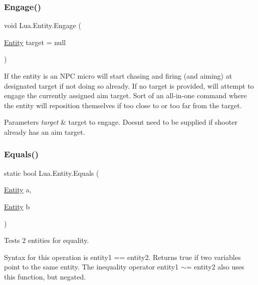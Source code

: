 \subsubsection{\texorpdfstring{Engage()}{Engage()}}
{\footnotesize\ttfamily void Lua.\+Entity.\+Engage (\begin{DoxyParamCaption}\item[{\mbox{\hyperlink{class_lua_1_1_entity}{Entity}}}]{target = {\ttfamily null} }\end{DoxyParamCaption})}



If the entity is an N\+PC micro will start chasing and firing (and aiming) at designated target if not doing so already. If no target is provided, will attempt to engage the currently assigned aim target. Sort of an all-\/in-\/one command where the entity will reposition themselves if too close to or too far from the target. 


\begin{DoxyParams}{Parameters}
{\em target} & target to engage. Doesn\textquotesingle{}t need to be supplied if shooter already has an aim target.\\
\hline
\end{DoxyParams}
\mbox{\label{class_lua_1_1_entity_ac55e7536a3bdc7a6b9a3fa6a759db9ee}} 
\subsubsection{\texorpdfstring{Equals()}{Equals()}}
{\footnotesize\ttfamily static bool Lua.\+Entity.\+Equals (\begin{DoxyParamCaption}\item[{\mbox{\hyperlink{class_lua_1_1_entity}{Entity}}}]{a,  }\item[{\mbox{\hyperlink{class_lua_1_1_entity}{Entity}}}]{b }\end{DoxyParamCaption})\hspace{0.3cm}{\ttfamily [static]}}



Tests 2 entities for equality. 

Syntax for this operation is {\ttfamily entity1 == entity2}. Returns true if two variables point to the same entity. The inequality operator {\ttfamily entity1 $\sim$= entity2} also uses this function, but negated. \mbox{\label{class_lua_1_1_entity_a23180e62c487b6c3923e39b3be84b291}} 
